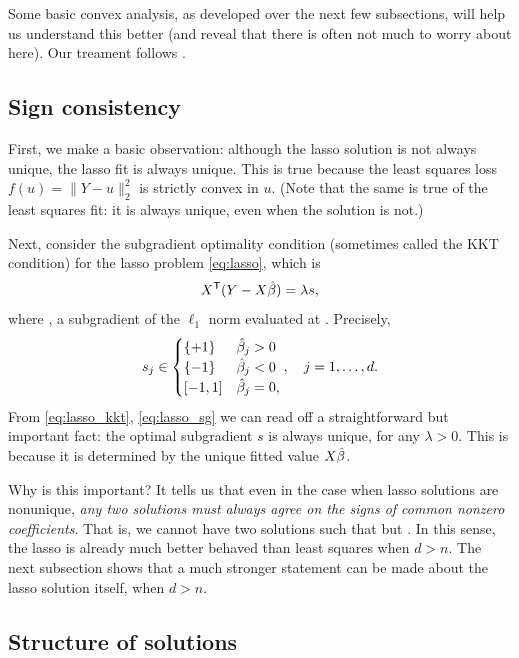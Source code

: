 \documentclass{article}
\begin{document}
Some basic convex analysis, as developed over the next few subsections, will
help us understand this better (and reveal that there is often not much to worry
about here). Our treament follows \citet{tibshirani2013lasso}.

\subsection{Sign consistency}

First, we make a basic observation: although the lasso solution is not always 
unique, the lasso fit  is always unique. This is true because 
the least squares loss $f(u) = \|Y - u\|_2^2$ is strictly convex in $u$. (Note
that the same is true of the least squares fit: it is always unique, even when
the solution is not.)

Next, consider the subgradient optimality condition (sometimes called the KKT 
condition) for the lasso problem \eqref{eq:lasso}, which is
\begin{equation}
\label{eq:lasso_kkt}
X^{\mathsf{T}} (Y - X\hat{\beta}) = \lambda s,
\end{equation}
where , a subgradient of the $\ell_1$ norm
evaluated at \smash{$\hbeta$}. Precisely, 
\begin{equation}
\label{eq:lasso_sg}
s_j \in \begin{cases} 
\{+1\} & \hat{\beta}_j > 0 \\
\{-1\} & \hat{\beta}_j < 0 \\
[-1,1] & \hat{\beta}_j = 0,
\end{cases}, \quad j=1,\dots,d.
\end{equation}
From \eqref{eq:lasso_kkt}, \eqref{eq:lasso_sg} we can read off a straightforward
but important fact: the optimal subgradient $s$ is always unique, for any
$\lambda>0$. This is because it is determined by the unique fitted value
$X\hat{\beta}$.    

Why is this important? It tells us that even in the case when lasso solutions
are nonunique, \emph{any two solutions must always agree on the signs of common
  nonzero coefficients}. That is, we cannot have two solutions \smash{$\hbeta,
  \tilde\beta$} such that  but . In this sense, the lasso is already much better behaved than least
squares when $d>n$. The next subsection shows that a much stronger statement 
can be made about the lasso solution itself, when $d > n$.     

\subsection{Structure of solutions}
\end{document}
